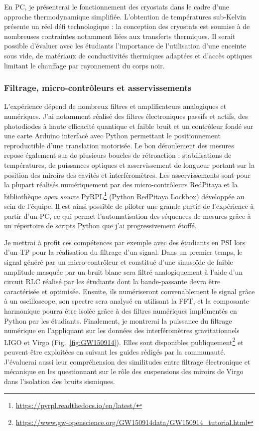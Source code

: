 \documentclass[12pt,a4paper]{article}
\begin{document}
En PC, je présenterai le fonctionnement des cryostats dans le cadre d'une approche thermodynamique simplifiée.
L'obtention de températures sub-Kelvin présente un réel défi technologique : la conception des cryostats est soumise à de nombreuses contraintes notamment liées aux transferts thermiques.
Il serait possible d'évaluer avec les étudiants l'importance de l'utilisation d'une enceinte sous vide, de matériaux de conductivités thermiques adaptées et d'accès optiques limitant le chauffage par rayonnement du corps noir.

\subsubsection{Filtrage, micro-contrôleurs et asservissements}
\label{sec:controls}

L'expérience dépend de nombreux filtres et amplificateurs analogiques et numériques.
J'ai notamment réalisé des filtres électroniques passifs et actifs, des photodiodes à haute efficacité quantique et faible bruit et un contrôleur fondé sur une carte Arduino interfacé avec Python permettant le positionnement reproductible d'une translation motorisée.
Le bon déroulement des mesures repose également sur de plusieurs boucles de rétroaction : stabilisations de températures, de puissances optiques et asservissement de longueur portant sur la position des miroirs des cavités et interféromètres.
Les asservissements sont pour la plupart réalisés numériquement par des micro-contrôleurs RedPitaya et la bibliothèque \textit{open source} PyRPL\footnote{\url{https://pyrpl.readthedocs.io/en/latest/}} (Python RedPitaya Lockbox) développée au sein de l'équipe.
Il est ainsi possible de piloter une grande partie de l'expérience à partir d'un PC, ce qui permet l'automatisation des séquences de mesures grâce à un répertoire de scripts Python que j'ai progressivement étoffé.

Je mettrai à profit ces compétences par exemple avec des étudiants en PSI lors d'un TP pour la réalisation du filtrage d'un signal.
Dans un premier temps, le signal généré par un micro-contrôleur et constitué d'une sinusoïde de faible amplitude masquée par un bruit blanc sera filtré analogiquement à l'aide d'un circuit RLC réalisé par les étudiants dont la bande-passante devra être caractérisée et optimisée.
Ensuite, ils numériseront convenablement le signal grâce à un oscilloscope, son spectre sera analysé en utilisant la FFT, et la composante harmonique pourra être isolée grâce à des filtres numériques implémentés en Python par les étudiants.
Finalement, je montrerai la puissance du filtrage numérique en l'appliquant sur les données des interféromètres gravitationnels LIGO et Virgo (Fig.~\ref{fig:GW150914}).
Elles sont disponibles publiquement\footnote{\url{https://www.gw-openscience.org/GW150914data/GW150914_tutorial.html}} et peuvent être exploitées en suivant les guides rédigés par la communauté.
J'évaluerai aussi leur compréhension des similitudes entre filtrage électronique et mécanique en les questionnant sur le rôle des suspensions des miroirs de Virgo dans l'isolation des bruits sismiques.
\end{document}
